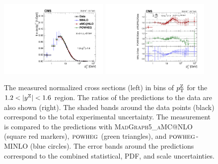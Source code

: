 \begin{figure}
	\centering
	\includegraphics[width=0.47\textwidth]{figures/zpt/zll_double_normrap3.pdf}
        \includegraphics[width=0.47\textwidth]{figures/zpt/zll_double_ratio_normrap3.pdf}
	\caption{The measured normalized cross sections (left) in bins of $p_{\mathrm{T}}^{\mathrm{Z}}$ for the $1.2 < |y^{\mathrm{Z}}| < 1.6$ region. The ratios of the predictions to the data are also shown (right). The shaded bands around the data points (black) correspond to the total experimental uncertainty. The measurement is compared to the predictions with \textsc{MadGraph5\_aMC@NLO} (square red markers),  ${\textsc{powheg}}$ (green triangles), and ${\textsc{powheg}}$-\textsc{MINLO} (blue circles). The error bands around the predictions correspond to the combined statistical, PDF, and scale uncertainties.}
	\label{fig:zll_norm3}
\end{figure}


